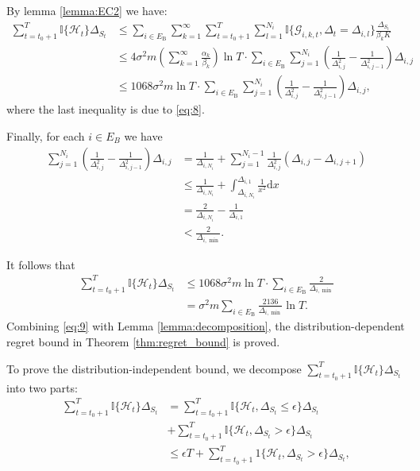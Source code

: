\documentclass[opre,sglanonrev]{informs4}
\begin{document}
By lemma \ref{lemma:EC2} we have:
$$\begin{aligned}
 \sum_{t=t_0+1}^T\mathbb{I}\{\mathcal{H}_t\}\Delta_{S_t}&\leq\sum_{i\in E_\mathrm{B}}\sum_{k=1}^\infty\sum_{t=t_0+1}^T\sum_{l=1}^{N_i}\mathbb{I}\{\mathcal{G}_{i,k,t},\Delta_t=\Delta_{i,l}\}\frac{\Delta_{S_t}}{\beta_kK} \\
 & \leq 4\sigma^2m\left(\sum_{k=1}^\infty\frac{\alpha_k}{\beta_k}\right)\ln T\cdot\sum_{i\in E_{\mathrm{B}}}\sum_{j=1}^{N_i}\left(\frac{1}{\Delta_{i,j}^2}-\frac{1}{\Delta_{i,j-1}^2}\right)\Delta_{i,j}\\
 & \leq1068\sigma^2m\ln T\cdot\sum_{i\in E_{\mathrm{B}}}\sum_{j=1}^{N_i}\left(\frac{1}{\Delta_{i,j}^2}-\frac{1}{\Delta_{i,j-1}^2}\right)\Delta_{i,j},
\end{aligned}$$
where the last inequality is due to \ref{eq:8}.

Finally, for each $i\in E_B$ we have 
$$\begin{aligned}
\sum_{j=1}^{N_i}\left(\frac{1}{\Delta_{i,j}^2}-\frac{1}{\Delta_{i,j-1}^2}\right)\Delta_{i,j} & =\frac{1}{\Delta_{i,N_i}}+\sum_{j=1}^{N_i-1}\frac{1}{\Delta_{i,j}^2}(\Delta_{i,j}-\Delta_{i,j+1}) \\
 & \leq\frac{1}{\Delta_{i,N_i}}+\int_{\Delta_{i,N_i}}^{\Delta_{i,1}}\frac{1}{x^2}\mathrm{d}x \\
 & =\frac{2}{\Delta_{i,N_i}}-\frac{1}{\Delta_{i,1}} \\
 & <\frac{2}{\Delta_{i,\min}}.
\end{aligned}$$

It follows that 
\begin{equation}
    \label{eq:9}
	\begin{aligned}
	\sum_{t=t_0+1}^T\mathbb{I}\{\mathcal{H}_t\}\Delta_{S_t}&\leq1068\sigma^2m\ln T\cdot\sum_{i\in E_\mathrm{B}}\frac{2}{\Delta_{i,\min}}\\
	&=\sigma^2m\sum_{i\in E_\mathrm{B}}\frac{2136}{\Delta_{i,\min}}\ln T.
	\end{aligned}
\end{equation}
Combining \ref{eq:9} with Lemma \ref{lemma:decomposition}, the distribution-dependent regret bound in Theorem \ref{thm:regret_bound} is proved.

To prove the distribution-independent bound, we decompose $\sum_{t=t_0+1}^T\mathbb{I}\{\mathcal{H}_t\}\Delta_{S_t}$ into two parts:
\begin{equation*}\begin{aligned}
\sum_{t=t_0+1}^T\mathbb{I}\{\mathcal{H}_t\}\Delta_{S_t}&=\sum_{t=t_0+1}^T\mathbb{I}\{\mathcal{H}_t,\Delta_{S_t}\leq\epsilon\}\Delta_{S_t}\\
&+\sum_{t=t_0+1}^T\mathbb{I}\{\mathcal{H}_t,\Delta_{S_t}>\epsilon\}\Delta_{S_t}\\
&\leq\epsilon T+\sum_{t=t_0+1}^T1\{\mathcal{H}_t,\Delta_{S_t}>\epsilon\}\Delta_{S_t},
\end{aligned}\end{equation*}
\end{document}
